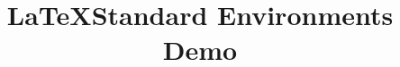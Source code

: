 \documentclass[10pt,a4paper]{article}
\title{\LaTeX Standard Environments Demo}
\begin{document}
\maketitle
\tableofcontents
\pagebreak




\end{document}
